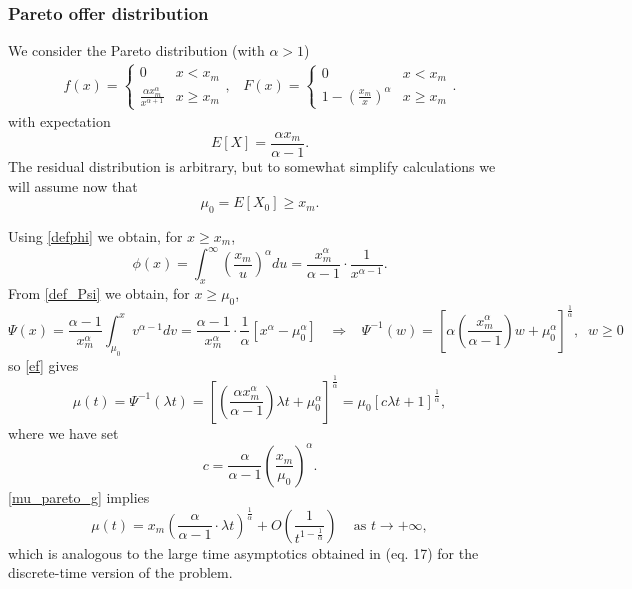 \documentclass{article}
\numberwithin{equation}{section}
\begin{document}
	\subsubsection{Pareto offer distribution}
	\label{policy_pareto}
	
	We consider the Pareto distribution (with $\alpha>1$)
	\begin{align}\label{pareto}f(x)=\begin{cases}
			0 &  x < x_m\\
			\frac{\alpha x_m^\alpha}{x^{\alpha+1}} & x\geq x_m
		\end{cases},\;\;\;F(x)=\begin{cases}
			0 &  x < x_m\\
			1-\left(\frac{x_m}{x} \right)^\alpha & x\geq x_m
		\end{cases}.\end{align}
	with expectation
	\begin{equation}\label{mu_0_pareto}E[X]=\frac{\alpha x_m}{\alpha-1}.\end{equation}
	The residual distribution is arbitrary, but to somewhat simplify calculations we will assume now that 
	$$\mu_0=E[X_0]\geq x_m.$$
	
	Using \eqref{defphi} we obtain, for 
	$x\geq x_m$,
	\begin{equation}\label{phi_pareto}
		\phi(x)=\int_x^\infty \left(\frac{x_m}{u} \right)^\alpha du=\frac{x_m^\alpha}{\alpha-1}\cdot \frac{1}{x^{\alpha-1}}.\end{equation}
	From \eqref{def_Psi} we obtain, for $x\geq \mu_0$,
	$$\Psi(x)=\frac{\alpha-1}{x_m^\alpha}\int_{\mu_0}^x v^{\alpha-1}dv=\frac{\alpha-1}{x_m^\alpha}\cdot\frac{1}{\alpha }\left[x^\alpha-\mu_0^\alpha \right]\;\;\;\Rightarrow\;\;\; \Psi^{-1}(w)=\left[\alpha\left(\frac{x_m^\alpha}{\alpha-1}\right) w+\mu_0^\alpha\right]^{\frac{1}{\alpha}},\;\;w\geq 0$$
	so \eqref{ef} gives
	\begin{equation}\label{mu_pareto_g}
		\mu(t)=\Psi^{-1}(\lambda t)=\left[\left(\frac{\alpha x_m^\alpha}{\alpha-1}\right) \lambda t+\mu_0^\alpha\right]^{\frac{1}{\alpha}}=\mu_0[c\lambda t+1]^{\frac{1}{\alpha}},\end{equation}
	where we have set
	\begin{equation}\label{defc}c=\frac{\alpha}{\alpha-1}\left(\frac{x_m}{\mu_0} \right)^\alpha.\end{equation}
	\eqref{mu_pareto_g} implies
	$$\mu(t)=x_m\left(\frac{\alpha }{\alpha-1}\cdot \lambda  t \right)^{\frac{1}{\alpha}}+O\left(\frac{1}{t^{1-\frac{1}{\alpha}}} \right)\;\;\;{\mbox{ as }} t\rightarrow +\infty,$$
	which is analogous to the large time asymptotics obtained in \cite{entwistle}
	(eq. 17) for the discrete-time version of the problem.
	
\end{document}
